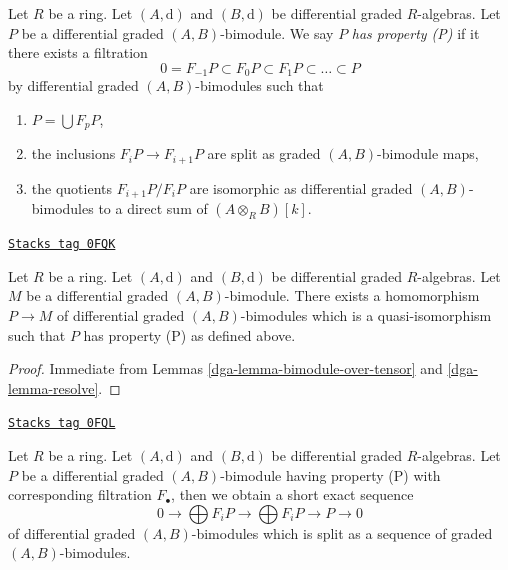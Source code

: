 Let $R$ be a ring. Let $(A, \text{d})$ and $(B, \text{d})$ be
differential graded $R$-algebras.
Let $P$ be a differential graded $(A, B)$-bimodule. We say $P$
{\it has property (P)} if it there exists a filtration
$$
0 = F_{-1}P \subset F_0P \subset F_1P \subset \ldots \subset P
$$
by differential graded $(A, B)$-bimodules such that
\begin{enumerate}
\item $P = \bigcup F_pP$,
\item the inclusions $F_iP \to F_{i + 1}P$ are split as graded
$(A, B)$-bimodule maps,
\item the quotients $F_{i + 1}P/F_iP$ are isomorphic as differential
graded $(A, B)$-bimodules to a direct sum of $(A \otimes_R B)[k]$.
\end{enumerate}

\begin{lemma}
\label{dga-lemma-bimodule-resolve}
\href{https://stacks.math.columbia.edu/tag/0FQK}{\texttt{Stacks tag 0FQK}}

Let $R$ be a ring. Let $(A, \text{d})$ and $(B, \text{d})$ be
differential graded $R$-algebras. Let $M$ be a differential graded
$(A, B)$-bimodule. There exists a homomorphism $P \to M$
of differential graded $(A, B)$-bimodules which is a quasi-isomorphism
such that $P$ has property (P) as defined above.
\end{lemma}

\begin{proof}

Immediate from Lemmas \ref{dga-lemma-bimodule-over-tensor} and
\ref{dga-lemma-resolve}.
\end{proof}

\begin{lemma}
\label{dga-lemma-bimodule-property-P-sequence}
\href{https://stacks.math.columbia.edu/tag/0FQL}{\texttt{Stacks tag 0FQL}}

Let $R$ be a ring. Let $(A, \text{d})$ and $(B, \text{d})$ be
differential graded $R$-algebras. Let $P$ be a
differential graded $(A, B)$-bimodule having property (P)
with corresponding filtration $F_\bullet$, then we obtain a
short exact sequence
$$
0 \to
\bigoplus\nolimits F_iP \to
\bigoplus\nolimits F_iP \to P \to 0
$$
of differential graded $(A, B)$-bimodules which is split as a sequence
of graded $(A, B)$-bimodules.
\end{lemma}

